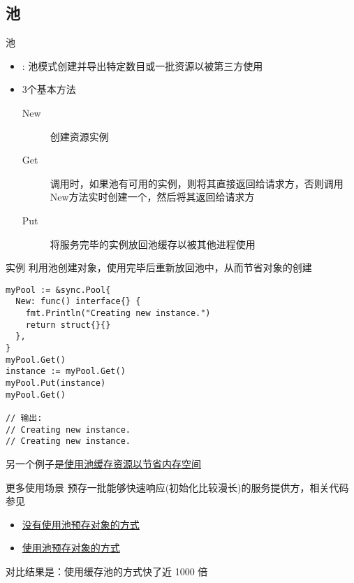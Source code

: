 \subsection{池\Pool }
\begin{frame}{池\Pool }
    \begin{itemize}
        \item {}: 池模式创建并导出特定数目或一批资源以被第三方使用
        \item 3个基本方法
            \begin{description}
                \item[New] 创建资源实例
                \item[Get] 调用时，如果池有可用的实例，则将其直接返回给请求方，否则调用New方法实时创建一个，然后将其返回给请求方
                \item[Put] 将服务完毕的实例放回池缓存以被其他进程使用
            \end{description}
    \end{itemize}
\end{frame}

\begin{frame}[fragile]{实例}
    利用池创建对象，\alert{使用完毕后重新放回池中}，从而节省对象的创建
\begin{lstlisting}
myPool := &sync.Pool{
  New: func() interface{} {
    fmt.Println("Creating new instance.")
    return struct{}{}
  },
}
myPool.Get()
instance := myPool.Get()
myPool.Put(instance)
myPool.Get()

// 输出:
// Creating new instance.
// Creating new instance.
\end{lstlisting}

另一个例子是\href{https://github.com/sammyne/concurrency-in-go/blob/master/chapter03/sync.pkg/pool/basic2.go}{使用池缓存资源以节省内存空间}

\end{frame}

\begin{frame}{更多使用场景}
    预存一批能够快速响应(初始化比较漫长)的服务提供方，相关代码参见
    \begin{itemize}
        \item \href{https://github.com/sammyne/concurrency-in-go/blob/master/chapter03/sync.pkg/pool/slow_network_service_benchmark_test.go}{没有使用池预存对象的方式}
        \item \href{https://github.com/sammyne/concurrency-in-go/blob/master/chapter03/sync.pkg/pool/slow_network_service_benchmark_test.go}{使用池预存对象的方式}
    \end{itemize}

    对比结果是：使用缓存池的方式快了近 1000 倍
\end{frame}

